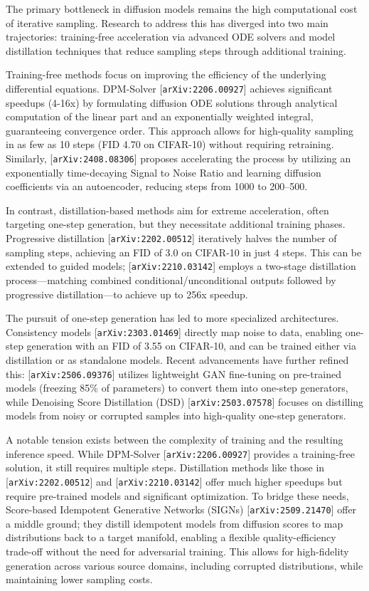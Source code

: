 \documentclass[11pt]{article}
\begin{document}
The primary bottleneck in diffusion models remains the high computational cost of iterative sampling. Research to address this has diverged into two main trajectories: training-free acceleration via advanced ODE solvers and model distillation techniques that reduce sampling steps through additional training.

Training-free methods focus on improving the efficiency of the underlying differential equations. DPM-Solver [\texttt{arXiv:2206.00927}] achieves significant speedups (4-16x) by formulating diffusion ODE solutions through analytical computation of the linear part and an exponentially weighted integral, guaranteeing convergence order. This approach allows for high-quality sampling in as few as 10 steps (FID 4.70 on CIFAR-10) without requiring retraining. Similarly, [\texttt{arXiv:2408.08306}] proposes accelerating the process by utilizing an exponentially time-decaying Signal to Noise Ratio and learning diffusion coefficients via an autoencoder, reducing steps from 1000 to 200–500.

In contrast, distillation-based methods aim for extreme acceleration, often targeting one-step generation, but they necessitate additional training phases. Progressive distillation [\texttt{arXiv:2202.00512}] iteratively halves the number of sampling steps, achieving an FID of 3.0 on CIFAR-10 in just 4 steps. This can be extended to guided models; [\texttt{arXiv:2210.03142}] employs a two-stage distillation process—matching combined conditional/unconditional outputs followed by progressive distillation—to achieve up to 256x speedup.

The pursuit of one-step generation has led to more specialized architectures. Consistency models [\texttt{arXiv:2303.01469}] directly map noise to data, enabling one-step generation with an FID of 3.55 on CIFAR-10, and can be trained either via distillation or as standalone models. Recent advancements have further refined this: [\texttt{arXiv:2506.09376}] utilizes lightweight GAN fine-tuning on pre-trained models (freezing 85\% of parameters) to convert them into one-step generators, while Denoising Score Distillation (DSD) [\texttt{arXiv:2503.07578}] focuses on distilling models from noisy or corrupted samples into high-quality one-step generators.

A notable tension exists between the complexity of training and the resulting inference speed. While DPM-Solver [\texttt{arXiv:2206.00927}] provides a training-free solution, it still requires multiple steps. Distillation methods like those in [\texttt{arXiv:2202.00512}] and [\texttt{arXiv:2210.03142}] offer much higher speedups but require pre-trained models and significant optimization. To bridge these needs, Score-based Idempotent Generative Networks (SIGNs) [\texttt{arXiv:2509.21470}] offer a middle ground; they distill idempotent models from diffusion scores to map distributions back to a target manifold, enabling a flexible quality-efficiency trade-off without the need for adversarial training. This allows for high-fidelity generation across various source domains, including corrupted distributions, while maintaining lower sampling costs.
\end{document}
